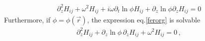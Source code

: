 \documentclass[
 jor,
 amsmath,amssymb,preprint,
]{revtex4-2}
\begin{document}
\begin{align}
\partial_z^2 H_{ij} + \omega^2 H_{ij} + i\omega \partial_t\ln \phi H_{ij} + \partial_z\ln \phi \partial_zH_{ij} = 0 \label{ferorg}
\end{align}
Furthermore, if $\phi = \phi(\vec{r})$, the expression eq.\eqref{ferorg} is solvable
\begin{equation}
\begin{aligned}
\partial_z^2 H_{ij} + \partial_z \ln\phi\,\partial_z H_{ij} + \omega^2 H_{ij} = 0 \,,
\end{aligned}
\end{equation}
\begin{comment}
giving rise to, in terms of eq.\eqref{sptsol} in Appendix \ref{sec:appa} with $y(z) = -\frac{1}{2}\partial_z^2g(z)$, $g(z) = \ln\phi$,
\begin{equation}
\begin{aligned}
h^{(o)}_{ab}(\omega) = & \sqrt{\frac{G_o}{G_s}} \exp\bigg[ - \frac{i z\partial_z^2 \ln\phi}{4\omega} \bigg] h_{ab}^{(s)}(\omega) = \sqrt{\frac{G_o}{G_s}} \exp\bigg[i\omega z\frac{\partial_z^2 \ln G_o}{4\omega^2} \bigg] h_{ab}^{(s)}(\omega) \,. \label{fersptsol}
\end{aligned}
\end{equation}
\textcolor{red}{The general form is ??}
\begin{equation}
h^{(o)}_{ab}(\omega) = \sqrt{\frac{G_o}{G_s}} \exp\bigg[i\frac{ \nabla^2 \ln G_o}{4\omega^2} \vec{k}\cdot\vec{r} \bigg] h_{ab}^{(s)}(\omega) ??
\end{equation}


\end{comment}
\end{document}
